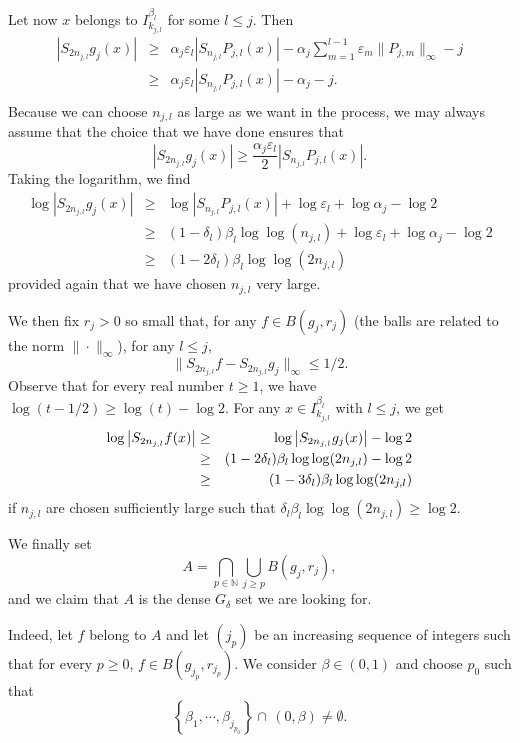 \documentclass[11pt,a4paper]{amsart}
\theoremstyle{plain}
\begin{document}
Let now $x$ belongs to $I_{k_{j,l}}^{\beta_{l}}$ for some $l\leq j$. Then
\begin{eqnarray*}
\left|S_{2n_{j,l}}g_j(x)\right|&\geq&\alpha_j {\varepsilon}_l \left|S_{n_{j,l}}P_{j,l}(x)\right|-\alpha_j\sum_{m=1}^{l-1}{\varepsilon}_m \|P_{j,m}\|_\infty-j\\
&\geq&\alpha_j{\varepsilon}_l \left|S_{n_{j,l}}P_{j,l}(x)\right|-\alpha_j-j.\\
\end{eqnarray*}
Because we can choose $n_{j,l}$ as large as we want in the process, 
we may always assume that the choice that we have done ensures that
$$\left|S_{2n_{j,l}}g_j(x)\right|\geq\frac{\alpha_j{\varepsilon}_l}2 \left|S_{n_{j,l}}P_{j,l}(x)\right|.$$
Taking the logarithm, we find
\begin{eqnarray*}
\log \left|S_{2n_{j,l}}g_j(x)\right|&\geq&\log \left|S_{n_{j,l}}P_{j,l}(x)\right|+\log {\varepsilon}_l+\log \alpha_j-\log 2\\
&\geq&(1-\delta_l)\beta_l \log\log(n_{j,l})+\log {\varepsilon}_l+\log\alpha_j-\log 2\\
&\geq&(1-2\delta_l)\beta_l \log\log(2n_{j,l})
\end{eqnarray*}
provided again that we have chosen $n_{j,l}$ very large. 

We then fix $r_j>0$ so small that, for any $f\in B(g_j,r_j)$ 
(the balls are related to the norm $\|\cdot\|_\infty$), for any $l\leq j$, 
$$\|S_{2n_{j,l}}f-S_{2n_{j,l}}g_j\|_\infty\le 1/2.$$ 
Observe that for every
real number $t \ge 1$, we have  
$\log(t-1/2)\ge \log(t)-\log 2$. 
For any $x\in I_{k_{j,l}}^{\beta_{l}}$ with $l\le j$,  we get 
\begin{eqnarray*}
\log \left|S_{2n_{j,l}}f(x)\right|&\ge&\log
\left|S_{2n_{j,l}}g_j(x)\right|-\log 2\cr
&\ge&(1-2\delta_l)\beta_l\log \log (2n_{j,l})-\log2\cr
&\ge&(1-3\delta_l)\beta_l\log \log (2n_{j,l})
\end{eqnarray*}
if $n_{j,l}$ are chosen sufficiently large such that $\delta_l\beta_l\log \log
(2n_{j,l})\ge\log 2$. 

We finally set 
$$A=\bigcap_{p\in{\mathbb N}}\bigcup_{j\geq p}B(g_j,r_j),$$ 
and we claim that $A$
is the dense $G_\delta$ set we are looking for. 

Indeed, let $f$ belong to $A$ and let $(j_p)$ be an increasing sequence
of integers such that for every $p\ge 0$, $f\in B(g_{j_p},r_{j_p})$. We consider
$\beta\in(0,1)$ and choose $p_0$ such that
$$\left\{\beta_1,\cdots,\beta_{j_{p_0}}\right\}\cap\, (0,\beta)\not=\emptyset .$$
\end{document}
